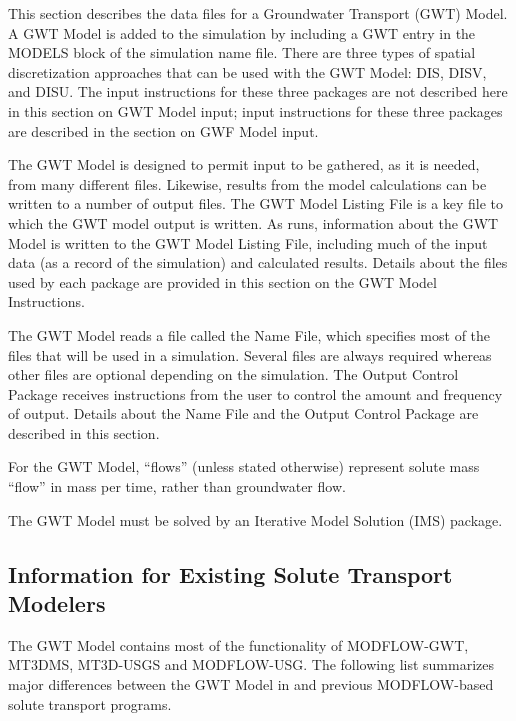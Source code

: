 This section describes the data files for a \mf Groundwater Transport (GWT) Model.  A GWT Model is added to the simulation by including a GWT entry in the MODELS block of the simulation name file.  There are three types of spatial discretization approaches that can be used with the GWT Model: DIS, DISV, and DISU.  The input instructions for these three packages are not described here in this section on GWT Model input; input instructions for these three packages are described in the section on GWF Model input.

The GWT Model is designed to permit input to be gathered, as it is needed, from many different files.  Likewise, results from the model calculations can be written to a number of output files. The GWT Model Listing File is a key file to which the GWT model output is written.  As \mf runs, information about the GWT Model is written to the GWT Model Listing File, including much of the input data (as a record of the simulation) and calculated results.  Details about the files used by each package are provided in this section on the GWT Model Instructions.

The GWT Model reads a file called the Name File, which specifies most of the files that will be used in a simulation. Several files are always required whereas other files are optional depending on the simulation. The Output Control Package receives instructions from the user to control the amount and frequency of output.  Details about the Name File and the Output Control Package are described in this section.

For the GWT Model, ``flows'' (unless stated otherwise) represent solute mass ``flow'' in mass per time, rather than groundwater flow.  

The GWT Model must be solved by an Iterative Model Solution (IMS) package.

\subsection{Information for Existing Solute Transport Modelers}
The \mf GWT Model contains most of the functionality of MODFLOW-GWT, MT3DMS, MT3D-USGS and MODFLOW-USG.  The following list summarizes major differences between the GWT Model in \mf and previous MODFLOW-based solute transport programs.


